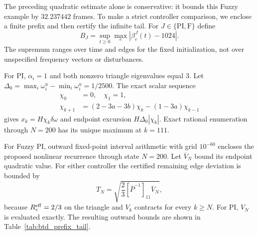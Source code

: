 The preceding quadratic estimate alone is conservative: it bounds this
Fuzzy example by $32.237442$ frames. To make a strict controller
comparison, we enclose a finite prefix and then certify the infinite tail.
For $J\in\{\mathrm{PI},\mathrm F\}$ define
\begin{equation}
 B_J=\sup_{t\ge0}\max_{e}|\beta_e^J(t)-1024|.
 \label{eq:btd_excursion}
\end{equation}
\balance
The supremum ranges over time and edges for the fixed initialization,
not over unspecified frequency vectors or disturbances.

For PI, $\alpha_i=1$ and both nonzero triangle eigenvalues equal 3.
Let $\Delta_0=\max_i\omega_i^u-\min_i\omega_i^u=1/2500$. The exact
scalar sequence
\begin{align}
 \chi_0&=0,\quad \chi_1=1,\nonumber\\
 \chi_{k+1}&=(2-3a-3b)\chi_k-(1-3a)\chi_{k-1}
 \label{eq:btd_pi_scalar}
\end{align}
gives $x_k=H\chi_k\delta\omega$ and endpoint excursion
$H\Delta_0|\chi_k|$. Exact rational enumeration through $N=200$ has its
unique maximum at $k=111$.

For Fuzzy PI, outward fixed-point interval arithmetic with grid
$10^{-60}$ encloses the proposed nonlinear recurrence through state
$N=200$. Let $\overline V_N$ bound its endpoint quadratic value.
For either controller the certified remaining edge deviation is bounded by
\begin{equation}
 T_N=\sqrt{\frac23[\bar P^{-1}]_{11}\overline V_N},
 \label{eq:btd_tail}
\end{equation}
because $R_e^{\rm eff}=2/3$ on the triangle and $V_k$ contracts for
every $k\ge N$. For PI, $V_N$ is evaluated exactly. The resulting
outward bounds are shown in Table~\ref{tab:btd_prefix_tail}.



